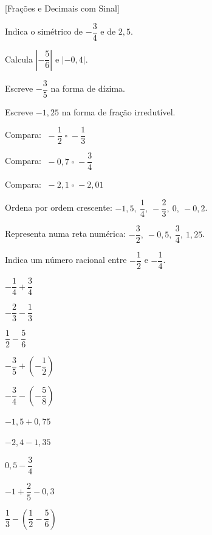 \documentclass[12pt]{article}
\begin{document}
[Frações e Decimais com Sinal]


\begin{exercicios}
  \item Indica o simétrico de $-\dfrac{3}{4}$ e de $2{,}5$.
  \item Calcula $\left|-\dfrac{5}{6}\right|$ e $|-0{,}4|$.
  \item Escreve $-\dfrac{3}{5}$ na forma de dízima.
  \item Escreve $-1{,}25$ na forma de fração irredutível.
  \item Compara: $\;-\dfrac{1}{2} \;\square\; -\dfrac{1}{3}$
  \item Compara: $\;-0{,}7 \;\square\; -\dfrac{3}{4}$
  \item Compara: $\;-2{,}1 \;\square\; -2{,}01$
  \item Ordena por ordem crescente: $-1{,}5,\ \dfrac{1}{4},\ -\dfrac{2}{3},\ 0,\ -0{,}2$.
  \item Representa numa reta numérica: $-\dfrac{3}{2},\ -0{,}5,\ \dfrac{3}{4},\ 1{,}25$.
  \item Indica um número racional entre $-\dfrac{1}{2}$ e $-\dfrac{1}{4}$.
\end{exercicios}

\begin{exercicios}
  \item $-\dfrac{1}{4} + \dfrac{3}{4}$
  \item $-\dfrac{2}{3} - \dfrac{1}{3}$
  \item $\dfrac{1}{2} - \dfrac{5}{6}$
  \item $-\dfrac{3}{5} + \left(-\dfrac{1}{2}\right)$
  \item $-\dfrac{3}{4} - \left(-\dfrac{5}{8}\right)$
  \item $-1{,}5 + 0{,}75$
  \item $-2{,}4 - 1{,}35$
  \item $0{,}5 - \dfrac{3}{4}$
  \item $-1 + \dfrac{2}{5} - 0{,}3$
  \item $\dfrac{1}{3} - \left(\dfrac{1}{2} - \dfrac{5}{6}\right)$
\end{exercicios}
\end{document}
